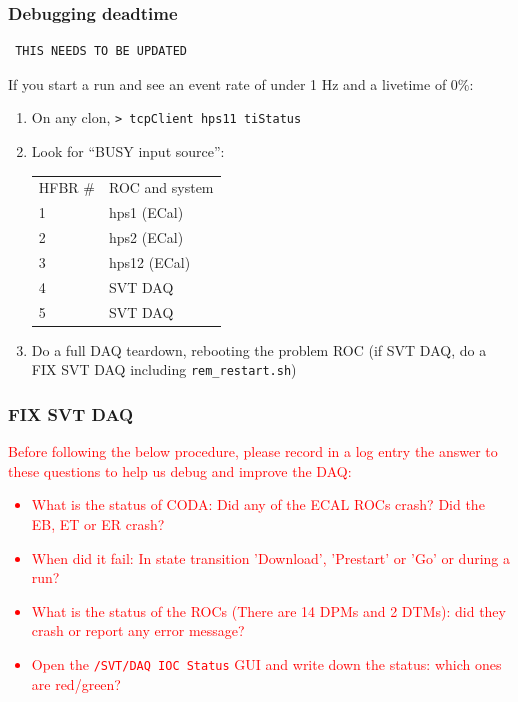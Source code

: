 \documentclass[12pt]{article}
\begin{document}
\subsubsection{Debugging deadtime}


\begin{verbatim} THIS NEEDS TO BE UPDATED \end{verbatim}



If you start a run and see an event rate of under 1 Hz and a livetime of 0\%:
\begin{enumerate}
\item On any clon,\newline
\texttt{> tcpClient hps11 tiStatus}\newline
\item Look for ``BUSY input source'':

\begin{tabular}{ l|l }
  HFBR \# & ROC and system \\
  1 & hps1 (ECal) \\
  2 & hps2 (ECal) \\
  3 & hps12 (ECal) \\
  4 & SVT DAQ \\
  5 & SVT DAQ \\
\end{tabular}
\item Do a full DAQ teardown, rebooting the problem ROC (if SVT DAQ, do a FIX SVT DAQ including \texttt{rem\_restart.sh})
\end{enumerate}









\subsubsection{FIX SVT DAQ}
\label{fixsvtdaq}

\textcolor{red}{
Before following the below procedure, please record in a log entry the answer to these questions to help us debug and improve the DAQ:
\begin{itemize}
\item What is the status of CODA: Did any of the ECAL ROCs crash? Did the EB, ET or ER crash? 
\item When did it fail: In state transition  'Download',  'Prestart'  or 'Go' or during a run?
\item What is the status of the ROCs (There are 14 DPMs and 2 DTMs): did they crash or report any error message?
\item Open the \texttt{/SVT/DAQ IOC Status} GUI and write down the status: which ones are red/green?
\end{itemize}
}
\end{document}
